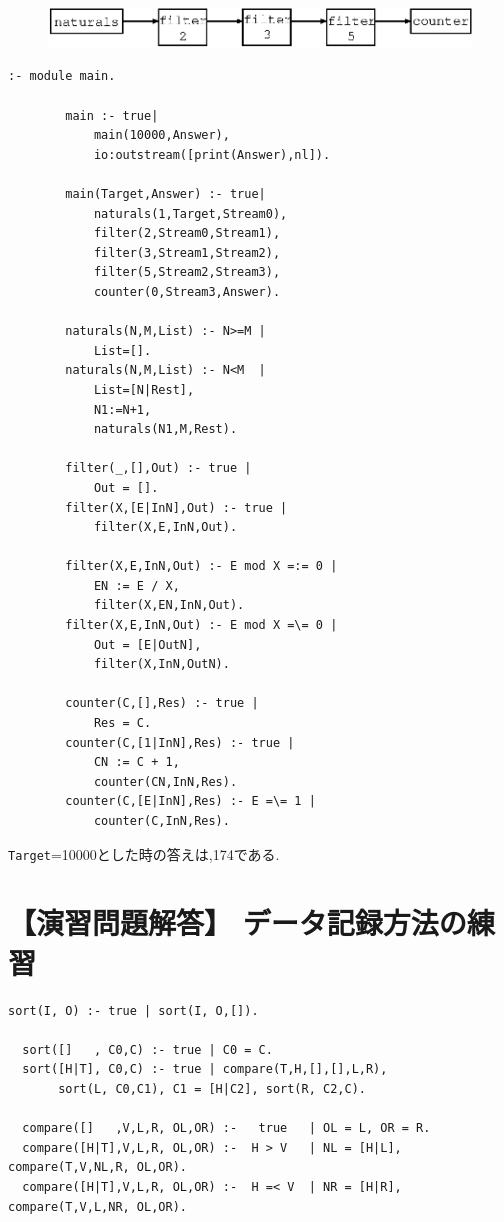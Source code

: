 \documentclass[a4,titlepage]{jsreport}
\newcounter{answer}
\newcommand{\answer}[1]{%
\section*{\refstepcounter{answer}【演習問題解答\arabic{answer}】 #1}}
\newenvironment{program}{\begin{quote}}{\end{quote}}
\begin{document}
\begin{figure}
\begin{center}
\includegraphics{fig/pipeline.eps}
\caption{}
\label{pipe_line}
\end{center}
\end{figure}

\begin{Verbatim}[baselinestretch=0.8]
        :- module main.

        main :- true|
            main(10000,Answer),
            io:outstream([print(Answer),nl]).

        main(Target,Answer) :- true|
            naturals(1,Target,Stream0),
            filter(2,Stream0,Stream1),
            filter(3,Stream1,Stream2),
            filter(5,Stream2,Stream3),
            counter(0,Stream3,Answer).

        naturals(N,M,List) :- N>=M |
            List=[].
        naturals(N,M,List) :- N<M  |
            List=[N|Rest],
            N1:=N+1,
            naturals(N1,M,Rest).

        filter(_,[],Out) :- true |
            Out = [].
        filter(X,[E|InN],Out) :- true |
            filter(X,E,InN,Out).

        filter(X,E,InN,Out) :- E mod X =:= 0 |
            EN := E / X,
            filter(X,EN,InN,Out).
        filter(X,E,InN,Out) :- E mod X =\= 0 |
            Out = [E|OutN],
            filter(X,InN,OutN).

        counter(C,[],Res) :- true |
            Res = C.
        counter(C,[1|InN],Res) :- true |
            CN := C + 1,
            counter(CN,InN,Res).
        counter(C,[E|InN],Res) :- E =\= 1 |
            counter(C,InN,Res).
\end{Verbatim}

\verb!Target!=10000とした時の答えは,174である.  

\answer{データ記録方法の練習}
\begin{Verbatim}[baselinestretch=0.8]
  sort(I, O) :- true | sort(I, O,[]).

  sort([]   , C0,C) :- true | C0 = C.
  sort([H|T], C0,C) :- true | compare(T,H,[],[],L,R),
       sort(L, C0,C1), C1 = [H|C2], sort(R, C2,C).

  compare([]   ,V,L,R, OL,OR) :-   true   | OL = L, OR = R.
  compare([H|T],V,L,R, OL,OR) :-  H > V   | NL = [H|L], compare(T,V,NL,R, OL,OR).
  compare([H|T],V,L,R, OL,OR) :-  H =< V  | NR = [H|R], compare(T,V,L,NR, OL,OR).
\end{Verbatim}
\end{document}
